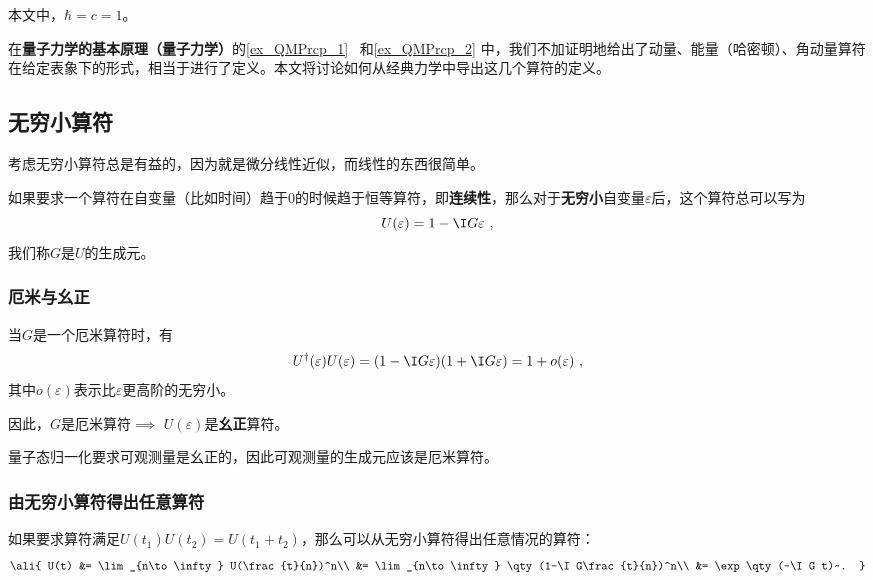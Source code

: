 

本文中，$\hbar=c=1$。

在\textbf{量子力学的基本原理（量子力学）}的\autoref{ex_QMPrcp_1}~ 和\autoref{ex_QMPrcp_2} 中，我们不加证明地给出了动量、能量（哈密顿）、角动量算符在给定表象下的形式，相当于进行了定义。本文将讨论如何从经典力学中导出这几个算符的定义。

\subsection{无穷小算符}



考虑无穷小算符总是有益的，因为就是微分线性近似，而线性的东西很简单。

如果要求一个算符在自变量（比如时间）趋于$0$的时候趋于恒等算符，即\textbf{连续性}，那么对于\textbf{无穷小}自变量$\varepsilon$后，这个算符总可以写为
\begin{equation}\label{eq_OprQM_1}
U(\varepsilon) = 1-\I G\varepsilon~,
\end{equation}
我们称$G$是$U$的生成元。

\subsubsection{厄米与幺正}

当$G$是一个厄米算符时，有
\begin{equation}
U^{\dagger}(\varepsilon)U(\varepsilon) = (1-\I G\varepsilon)(1+\I G\varepsilon) = 1+o(\varepsilon)~,
\end{equation}
其中$o(\varepsilon)$表示比$\varepsilon$更高阶的无穷小。

因此，$G$是厄米算符$\implies$ $U(\varepsilon)$是\textbf{幺正}算符。

量子态归一化要求可观测量是幺正的，因此可观测量的生成元应该是厄米算符。


\subsubsection{由无穷小算符得出任意算符}

如果要求算符满足$U(t_1)U(t_2)=U(t_1+t_2)$，那么可以从无穷小算符得出任意情况的算符：
\begin{equation}
\ali{
    U(t) &= \lim_{n\to\infty}  U(\frac{t}{n})^n\\
    &= \lim_{n\to\infty} \qty(1-\I G\frac{t}{n})^n\\
    &= \exp\qty(-\I G t)~.
}
\end{equation}



